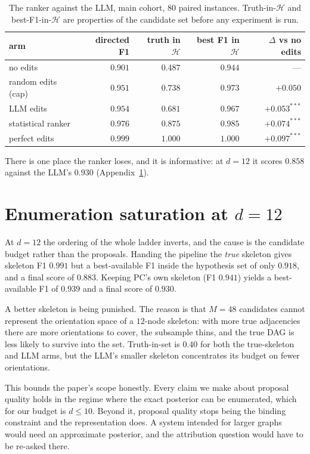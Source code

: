 \documentclass{article}
\begin{document}
\begin{table}[h]
\caption{The ranker against the LLM, main cohort, $80$ paired instances. Truth-in-$\mathcal{H}$ and
best-F1-in-$\mathcal{H}$ are properties of the candidate set before any experiment is run.}
\label{tab:ranker}
\centering
\small
\begin{tabular}{lrrrr}
\toprule
arm & directed F1 & truth in $\mathcal{H}$ & best F1 in $\mathcal{H}$ & $\Delta$ vs no edits \\
\midrule
no edits                & $0.901$ & $0.487$ & $0.944$ & --- \\
random edits (cap)      & $0.951$ & $0.738$ & $0.973$ & $+0.050$ \\
LLM edits               & $0.954$ & $0.681$ & $0.967$ & $+0.053^{***}$ \\
statistical ranker      & $0.976$ & $0.875$ & $0.985$ & $+0.074^{***}$ \\
perfect edits           & $0.999$ & $1.000$ & $1.000$ & $+0.097^{***}$ \\
\bottomrule
\end{tabular}
\end{table}

There is one place the ranker loses, and it is informative: at $d{=}12$ it scores $0.858$ against
the LLM's $0.930$ (Appendix~\ref{app:saturation}).

\section{Enumeration saturation at \texorpdfstring{$d=12$}{d=12}}
\label{app:saturation}

At $d{=}12$ the ordering of the whole ladder inverts, and the cause is the candidate budget rather
than the proposals. Handing the pipeline the \emph{true} skeleton gives skeleton F1 $0.991$ but a
best-available F1 inside the hypothesis set of only $0.918$, and a final score of $0.883$. Keeping
PC's own skeleton (F1 $0.941$) yields a best-available F1 of $0.939$ and a final score of $0.930$.

A better skeleton is being punished. The reason is that $M=48$ candidates cannot represent the
orientation space of a $12$-node skeleton: with more true adjacencies there are more orientations to
cover, the subsample thins, and the true DAG is less likely to survive into the set. Truth-in-set is
$0.40$ for both the true-skeleton and LLM arms, but the LLM's smaller skeleton concentrates its
budget on fewer orientations.

This bounds the paper's scope honestly. Every claim we make about proposal quality holds in the
regime where the exact posterior can be enumerated, which for our budget is $d \leq 10$. Beyond it,
proposal quality stops being the binding constraint and the representation does. A system intended
for larger graphs would need an approximate posterior, and the attribution question would have to be
re-asked there.
\end{document}
